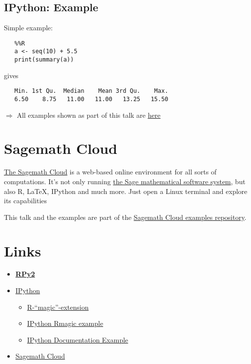 \documentclass[
paper=128mm:96mm, %
fontsize=11pt, %
pagesize, %
parskip=half-, %
]{scrartcl} %
\newcommand*{\mygreen}[1]{\textcolor{mygreen}{#1}}
\theoremstyle{mythmstyle} %
\def\shorttitle{R meets Python}
\newcommand*{\runninghead}{\shorttitle} %
\newcommand*{\newhead}[1]{\renewcommand*{\runninghead}{\shorttitle: #1}}
\begin{document}
\clearpage
\newhead{IPython: Example}
\subsection{IPython: Example}

Simple example:
\begin{verbatim}
   %%R
   a <- seq(10) + 5.5
   print(summary(a))
\end{verbatim}
gives
\begin{verbatim}
   Min. 1st Qu.  Median    Mean 3rd Qu.    Max.
   6.50    8.75   11.00   11.00   13.25   15.50
\end{verbatim}

\mygreen{$\Rightarrow{}$ All examples shown as part of this talk are
\href{http://nbviewer.ipython.org/urls/github.com/sagemath/cloud-examples/raw/master/r/rmagic.ipynb}{\uline{here}}}

\clearpage
\newhead{Sagemath Cloud}
\section{Sagemath Cloud}

\href{https://cloud.sagemath.org}{The Sagemath Cloud} is a web-based online
environment for all sorts of computations.
It's not only running
\href{http://www.sagemath.org}{the Sage mathematical software system},
but also R, LaTeX, IPython and much more.
Just open a Linux terminal and explore its capabilities \smiley

This talk and the examples are part of the
\href{https://github.com/sagemath/cloud-examples}{Sagemath Cloud examples repository}.

\clearpage
\newhead{Links}
\section{Links}

\begin{itemize}
\item \href{http://rpy.sourceforge.net/rpy2.html}{\textbf{RPy2}}
\item \href{http://www.ipython.org}{IPython}
\begin{itemize}
\item \href{http://ipython.org/ipython-doc/dev/config/extensions/rmagic.html}{R-``magic''-extension}
\item \href{http://nbviewer.ipython.org/urls/github.com/sagemath/cloud-examples/raw/master/r/rmagic.ipynb}{IPython Rmagic example}
\item \href{http://nbviewer.ipython.org/urls/github.com/ipython/ipython/raw/master/examples/notebooks/R Magics.ipynb}{IPython Documentation Example}
\end{itemize}
\item \href{https://cloud.sagemath.org}{Sagemath Cloud}
\end{itemize}
\end{document}
